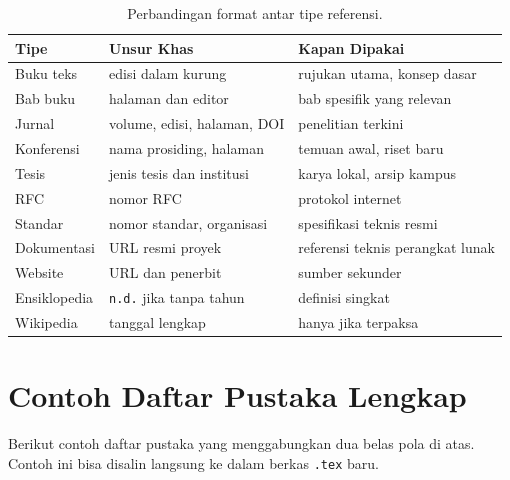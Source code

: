\documentclass[11pt,a4paper]{article}
\begin{document}
\begin{table}[H]
	\centering
	\caption{Perbandingan format antar tipe referensi.}
	\label{tab:ref-types}
	\footnotesize
	\begin{tabularx}{\textwidth}{l X X}
		\toprule
		Tipe         & Unsur Khas                     & Kapan Dipakai                    \\
		\midrule
		Buku teks    & edisi dalam kurung             & rujukan utama, konsep dasar      \\
		Bab buku     & halaman dan editor             & bab spesifik yang relevan        \\
		Jurnal       & volume, edisi, halaman, DOI    & penelitian terkini               \\
		Konferensi   & nama prosiding, halaman        & temuan awal, riset baru          \\
		Tesis        & jenis tesis dan institusi      & karya lokal, arsip kampus        \\
		RFC          & nomor RFC                      & protokol internet                \\
		Standar      & nomor standar, organisasi      & spesifikasi teknis resmi         \\
		Dokumentasi  & URL resmi proyek               & referensi teknis perangkat lunak \\
		Website      & URL dan penerbit               & sumber sekunder                  \\
		Ensiklopedia & \texttt{n.d.} jika tanpa tahun & definisi singkat                 \\
		Wikipedia    & tanggal lengkap                & hanya jika terpaksa              \\
		\bottomrule
	\end{tabularx}
\end{table}

\section{Contoh Daftar Pustaka Lengkap}

Berikut contoh daftar pustaka yang menggabungkan dua belas pola di atas. Contoh ini bisa disalin langsung ke dalam berkas \texttt{.tex} baru.
\end{document}
